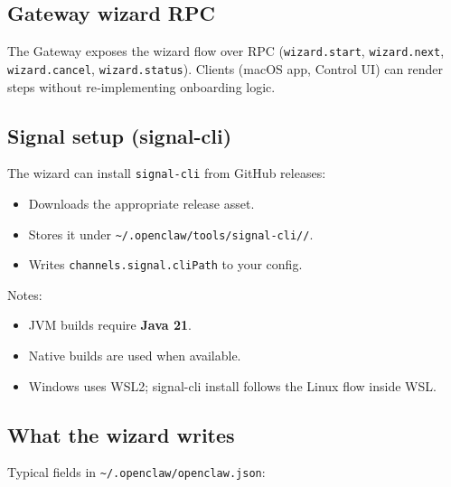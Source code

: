 \subsection{Gateway wizard RPC}


The Gateway exposes the wizard flow over RPC (\texttt{wizard.start}, \texttt{wizard.next}, \texttt{wizard.cancel}, \texttt{wizard.status}).
Clients (macOS app, Control UI) can render steps without re‑implementing onboarding logic.

\subsection{Signal setup (signal-cli)}


The wizard can install \texttt{signal-cli} from GitHub releases:

\begin{itemize}
  \item Downloads the appropriate release asset.
  \item Stores it under \texttt{\textasciitilde{}/.openclaw/tools/signal-cli//}.
  \item Writes \texttt{channels.signal.cliPath} to your config.
\end{itemize}


Notes:

\begin{itemize}
  \item JVM builds require \textbf{Java 21}.
  \item Native builds are used when available.
  \item Windows uses WSL2; signal-cli install follows the Linux flow inside WSL.
\end{itemize}


\subsection{What the wizard writes}


Typical fields in \texttt{\textasciitilde{}/.openclaw/openclaw.json}:

